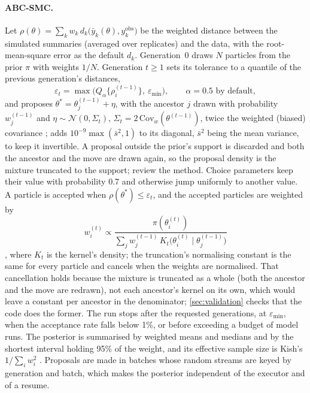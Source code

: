 \paragraph{ABC-SMC.} Let $\rho(\theta) = \sum_k w_k\, d_k\bigl(\bar y_k(\theta),
y_k^{\mathrm{obs}}\bigr)$ be the weighted distance between the simulated summaries (averaged
over replicates) and the data, with the root-mean-square error as the default $d_k$.
Generation~0 draws $N$ particles from the prior $\pi$ with weights $1/N$. Generation $t \ge 1$
sets its tolerance to a quantile of the previous generation's distances,
\begin{equation}
  \varepsilon_t = \max\bigl(Q_\alpha\{\rho_i^{(t-1)}\},\ \varepsilon_{\min}\bigr),
  \qquad \alpha = 0.5 \text{ by default},
\end{equation}
and proposes $\theta^\ast = \theta_j^{(t-1)} + \eta$, with the ancestor $j$ drawn with
probability $w_j^{(t-1)}$ and $\eta \sim \mathcal{N}(0, \Sigma_t)$, $\Sigma_t =
2\,\mathrm{Cov}_w(\theta^{(t-1)})$, twice the weighted (biased) covariance
\citep{beaumont2009adaptive}; \modelly{} adds $10^{-9}\max(\bar s^2, 1)$ to its diagonal,
$\bar s^2$ being the mean variance, to keep it invertible. A proposal outside the prior's
support is discarded and both the ancestor and the move are drawn again, so the
proposal density is the mixture truncated to the support; \citet{sisson2018handbook} review
the method. Choice parameters keep their value
with probability 0.7 and otherwise jump uniformly to another value. A particle is accepted
when $\rho(\theta^\ast) \le \varepsilon_t$, and the accepted particles are weighted by
\begin{equation}
  w_i^{(t)} \propto \frac{\pi(\theta_i^{(t)})}
  {\sum_j w_j^{(t-1)}\, K_t\bigl(\theta_i^{(t)} \mid \theta_j^{(t-1)}\bigr)}
  \label{eq:abc-weights}
\end{equation}
\citep{toni2009approximate}, where $K_t$ is the kernel's density; the truncation's normalising
constant is the same for every particle and cancels when the weights are normalised. That
cancellation holds because the mixture is truncated as a whole (both the ancestor and the
move are redrawn), not each ancestor's kernel on its own, which would leave a constant per
ancestor in the denominator; \cref{sec:validation} checks that the code does the former. The run
stops after the requested generations, at $\varepsilon_{\min}$, when the acceptance rate falls
below 1\%, or before exceeding a budget of model runs. The posterior is summarised by weighted
means and medians and by the shortest interval holding 95\% of the weight, and its effective
sample size is Kish's $1/\sum_i w_i^2$ \citep{kish1965survey}. Proposals are made in batches whose random streams are
keyed by generation and batch, which makes the posterior independent of the executor and of a
resume.

